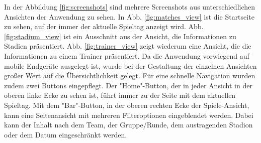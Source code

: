 \documentclass[runningheads,a4paper]{llncs}
\begin{document}
In der Abbildung \ref{fig:screenshots} sind mehrere Screenshots aus unterschiedlichen Ansichten der Anwendung zu sehen. In Abb. \ref{fig:matches_view} ist die Startseite zu sehen, auf der immer der aktuelle Spieltag anzeigt wird. Abb. \ref{fig:stadium_view} ist ein Ausschnitt aus der Ansicht, die Informationen zu Stadien präsentiert. Abb. \ref{fig:trainer_view} zeigt wiederum eine Ansicht, die die Informationen zu einem Trainer präsentiert. Da die Anwendung vorwiegend auf mobile Endgeräte ausgelegt ist, wurde bei der Gestaltung der einzelnen Ansichten großer Wert auf die Übersichtlichkeit gelegt. Für eine schnelle Navigation wurden zudem zwei Buttons eingepflegt. Der "Home"{}-Button, der in jeder Ansicht in der oberen linke Ecke zu sehen ist, führt immer zu der Seite mit dem aktuellen Spieltag. Mit dem "Bar"{}-Button, in der oberen rechten Ecke der Spiele-Ansicht, kann eine Seitenansicht mit mehreren Filteroptionen eingeblendet werden. Dabei kann der Inhalt nach dem Team, der Gruppe/Runde, dem austragenden Stadion oder dem Datum eingeschränkt werden.
\end{document}
